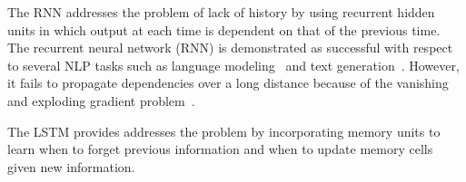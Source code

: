 \documentclass[11pt,letterpaper]{article}
\begin{document}
The RNN addresses the problem of lack of history by using recurrent hidden units in which output at each time is dependent on that of the previous time. 
The recurrent neural network (RNN) is demonstrated as successful with respect to several NLP tasks such as language modeling~\cite{mikolov2010recurrent} and text generation~\cite{sutskever2011generating}. However, it fails to propagate dependencies over a long distance because of the vanishing and exploding gradient problem~\cite{hochreiter1997long}. 

The LSTM provides addresses the problem by incorporating memory units to learn when to forget previous information and when to update memory cells given new information.

\end{document}
